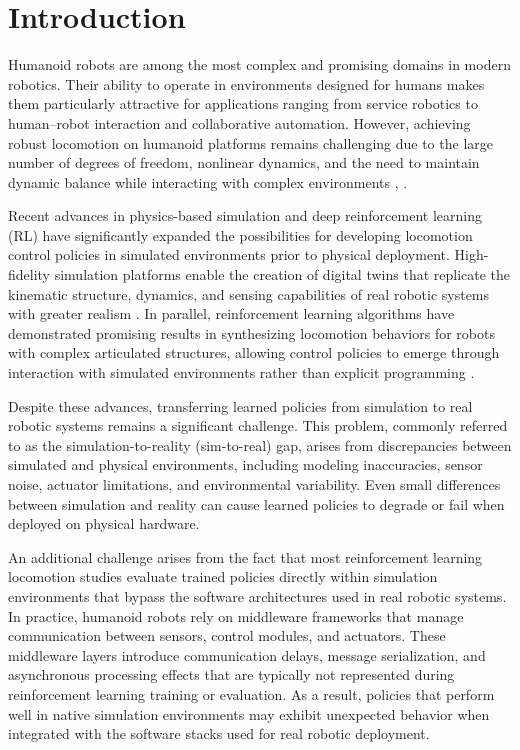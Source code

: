 \documentclass[pdflatex,sn-mathphys-num]{sn-jnl}%
\theoremstyle{thmstyleone}%
\theoremstyle{thmstyletwo}%
\theoremstyle{thmstylethree}%
\begin{document}

\maketitle

\section{Introduction}
\label{intro}

Humanoid robots are among the most complex and promising domains in modern robotics. Their ability to operate in environments designed for humans makes them particularly attractive for applications ranging from service robotics to human–robot interaction and collaborative automation. However, achieving robust locomotion on humanoid platforms remains challenging due to the large number of degrees of freedom, nonlinear dynamics, and the need to maintain dynamic balance while interacting with complex environments \cite{bib1}, \cite{bib2}.

Recent advances in physics-based simulation and deep reinforcement learning (RL) have significantly expanded the possibilities for developing locomotion control policies in simulated environments prior to physical deployment. High-fidelity simulation platforms enable the creation of digital twins that replicate the kinematic structure, dynamics, and sensing capabilities of real robotic systems with greater realism \cite{bib3}. In parallel, reinforcement learning algorithms have demonstrated promising results in synthesizing locomotion behaviors for robots with complex articulated structures, allowing control policies to emerge through interaction with simulated environments rather than explicit programming \cite{bib4}.

Despite these advances, transferring learned policies from simulation to real robotic systems remains a significant challenge. This problem, commonly referred to as the simulation-to-reality (sim-to-real) gap, arises from discrepancies between simulated and physical environments, including modeling inaccuracies, sensor noise, actuator limitations, and environmental variability. Even small differences between simulation and reality can cause learned policies to degrade or fail when deployed on physical hardware.

An additional challenge arises from the fact that most reinforcement learning locomotion studies evaluate trained policies directly within simulation environments that bypass the software architectures used in real robotic systems. In practice, humanoid robots rely on middleware frameworks that manage communication between sensors, control modules, and actuators. These middleware layers introduce communication delays, message serialization, and asynchronous processing effects that are typically not represented during reinforcement learning training or evaluation. As a result, policies that perform well in native simulation environments may exhibit unexpected behavior when integrated with the software stacks used for real robotic deployment.
\end{document}
